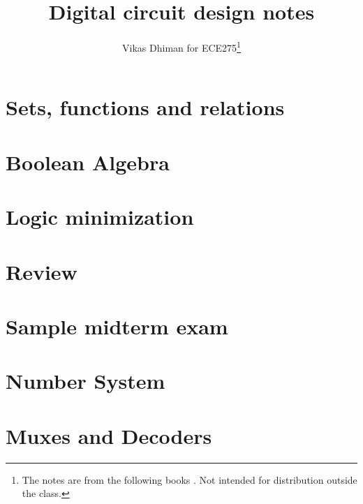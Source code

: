 \documentclass[oneside]{book}
\title{Digital circuit design notes}
\author{Vikas Dhiman for ECE275\footnote{The notes are from the following books \cite{harris2022digital,stephen2022fundamentals}. Not intended for distribution outside the class.}}
\begin{document}
\maketitle

\tableofcontents
\newpage
\listoftodos


\newpage


\chapter{Sets, functions and relations}

\chapter{Boolean Algebra}


%
% 
% 
\chapter{Logic minimization}




\chapter*{Review}

\chapter{Sample midterm exam}

\chapter{Number System}



\chapter{Muxes and Decoders}

\end{document}
